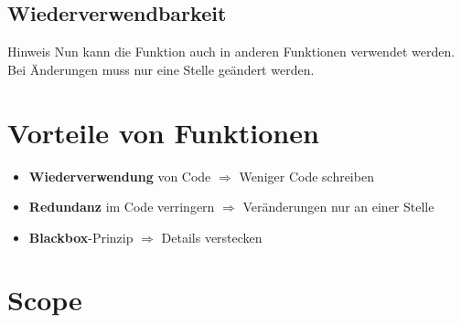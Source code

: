 \subsection{Wiederverwendbarkeit}
\begin{frame}
    \slidehead
    \vspace{-1ex}
    \vspace{-1ex}
    \begin{block}{Hinweis}
        Nun kann die Funktion auch in anderen Funktionen verwendet werden.
        Bei Änderungen muss nur eine Stelle geändert werden.
    \end{block}
\end{frame}

\section{Vorteile von Funktionen}
\begin{frame}
    \slidehead

    \begin{itemize}
        \item \textbf{Wiederverwendung} von Code $\Rightarrow$ Weniger Code schreiben
        \item \textbf{Redundanz} im Code verringern $\Rightarrow$ Veränderungen nur an einer Stelle
        \item \textbf{Blackbox}-Prinzip $\Rightarrow$ Details verstecken
    \end{itemize}
\end{frame}

\livecoding


\subtitle{Kapitel 6: wie Funktionen funktionieren}


\section{Scope}
